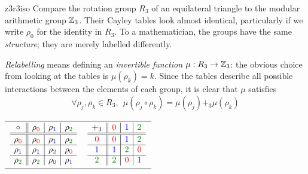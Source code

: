 \begin{example}{}{z3r3iso}
	Compare the rotation group $R_3$ of an equilateral triangle to the modular arithmetic group $\mathbb{Z}_3$. Their Cayley tables look almost identical, particularly if we write $\rho_0$ for the identity in $R_3$. To a mathematician, the groups have the same \emph{structure}; they are merely labelled differently.\par
	\begin{minipage}[t]{0.63\linewidth}\vspace{-5pt}
		\emph{Relabelling} means defining an \emph{invertible function} $\mu:R_3\to \mathbb{Z}_3$: the obvious choice from looking at the tables is $\mu(\rho_k)=k$.\smallbreak
		Since the tables describe all possible interactions between the elements of each group, it is clear that $\mu$ satisfies
		\[
			\forall \rho_j,\rho_k\in R_3,\ \ \mu(\rho_j\circ\rho_k)=\mu(\rho_j)+_3\mu(\rho_k)
		\]
	\end{minipage}
	\hfill
	\begin{minipage}[t]{0.36\linewidth}\vspace{-8pt}
		\flushright{}
		\begin{tabular}{@{}cc@{}}\def\arraystretch{1}
			$\begin{array}[t]{c||c|c|c}
				\circ&\rho_{\textcolor{red}{0}}&\rho_{\textcolor{blue}{1}}&\rho_{\textcolor{Green}{2}}\\\hline\hline
				\rho_{\textcolor{red}{0}}&\rho_{\textcolor{red}{0}}&\rho_{\textcolor{blue}{1}}&\rho_{\textcolor{Green}{2}}\\\hline
				\rho_{\textcolor{blue}{1}}&\rho_{\textcolor{blue}{1}}&\rho_{\textcolor{Green}{2}}&\rho_{\textcolor{red}{0}}\\\hline
				\rho_{\textcolor{Green}{2}}&\rho_{\textcolor{Green}{2}}&\rho_{\textcolor{red}{0}}&\rho_{\textcolor{blue}{1}}
			\end{array}$
			&\def\arraystretch{1}
			$\begin{array}[t]{c||c|c|c}
				+_3&\textcolor{red}{0}&\textcolor{blue}{1}&\textcolor{Green}{2}\\\hline\hline
				\textcolor{red}{0}&\textcolor{red}{0}&\textcolor{blue}{1}&\textcolor{Green}{2}\\\hline
				\textcolor{blue}{1}&\textcolor{blue}{1}&\textcolor{Green}{2}&\textcolor{red}{0}\\\hline
				\textcolor{Green}{2}&\textcolor{Green}{2}&\textcolor{red}{0}&\textcolor{blue}{1}
			\end{array}$\\

\end{tabular}
\end{minipage}
\end{example}
